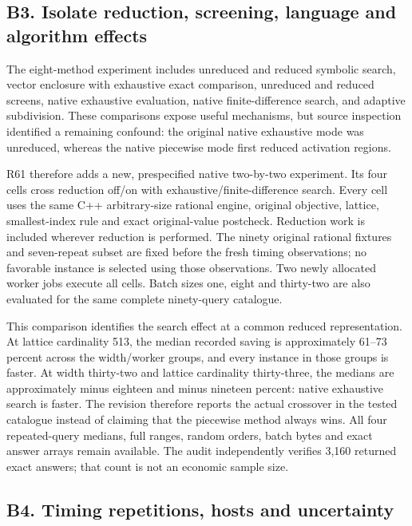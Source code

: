 \documentclass[ecta,nameyear,draft]{econsocart}
\begin{document}
\hypertarget{b3.-isolate-reduction-screening-language-and-algorithm-effects}{%
\subsection{B3. Isolate reduction, screening, language and algorithm
effects}\label{b3.-isolate-reduction-screening-language-and-algorithm-effects}}

The eight-method experiment includes unreduced and reduced symbolic
search, vector enclosure with exhaustive exact comparison, unreduced and
reduced screens, native exhaustive evaluation, native finite-difference
search, and adaptive subdivision. These comparisons expose useful
mechanisms, but source inspection identified a remaining confound: the
original native exhaustive mode was unreduced, whereas the native
piecewise mode first reduced activation regions.

R61 therefore adds a new, prespecified native two-by-two experiment. Its
four cells cross reduction off/on with exhaustive/finite-difference
search. Every cell uses the same C++ arbitrary-size rational engine,
original objective, lattice, smallest-index rule and exact
original-value postcheck. Reduction work is included wherever reduction
is performed. The ninety original rational fixtures and seven-repeat
subset are fixed before the fresh timing observations; no favorable
instance is selected using those observations. Two newly allocated
worker jobs execute all cells. Batch sizes one, eight and thirty-two are
also evaluated for the same complete ninety-query catalogue.

This comparison identifies the search effect at a common reduced
representation. At lattice cardinality 513, the median recorded saving
is approximately 61--73 percent across the width/worker groups, and
every instance in those groups is faster. At width thirty-two and
lattice cardinality thirty-three, the medians are approximately minus
eighteen and minus nineteen percent: native exhaustive search is faster.
The revision therefore reports the actual crossover in the tested
catalogue instead of claiming that the piecewise method always wins. All
four repeated-query medians, full ranges, random orders, batch bytes and
exact answer arrays remain available. The audit independently verifies
3,160 returned exact answers; that count is not an economic sample size.

\hypertarget{b4.-timing-repetitions-hosts-and-uncertainty}{%
\subsection{B4. Timing repetitions, hosts and
uncertainty}\label{b4.-timing-repetitions-hosts-and-uncertainty}}
\end{document}

